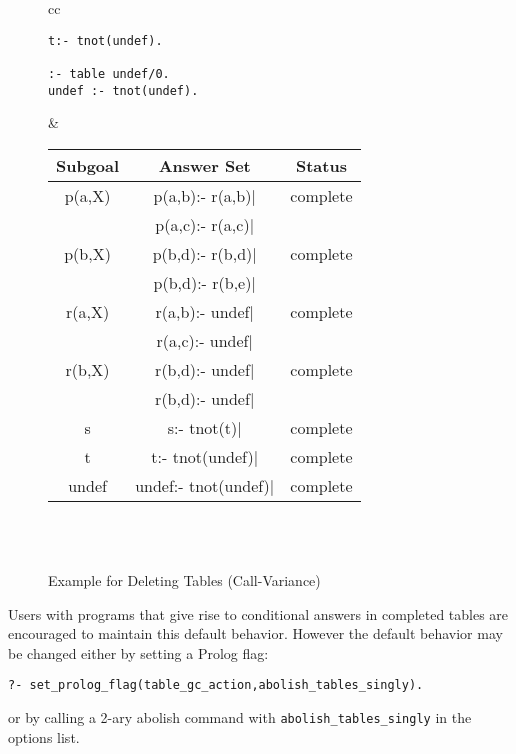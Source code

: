 \begin{description}
\begin{figure}[htb]
\begin{center}
\begin{tabular}{cc}
\begin{minipage}{14.5em}
\begin{verbatim}
t:- tnot(undef).

:- table undef/0.
undef :- tnot(undef).
\end{verbatim}
\end{minipage}
&
\begin{tabular}{|c|c|c|} \hline
  Subgoal & Answer Set & Status\\ \hline \hline
  p(a,X)  & p(a,b):- r(a,b)$|$ & complete \\ 
          & p(a,c):- r(a,c)$|$ & \\ \hline
  p(b,X)  & p(b,d):- r(b,d)$|$ & complete \\ 
          & p(b,d):- r(b,e)$|$ & \\ \hline \hline
  r(a,X)  & r(a,b):- undef$|$  & complete \\ 
          & r(a,c):- undef$|$  & \\ \hline
  r(b,X)  & r(b,d):- undef$|$  & complete \\ 
          & r(b,d):- undef$|$  & \\ \hline \hline
  s       & s:- tnot(t)$|$     & complete \\ \hline \hline
  t       & t:- tnot(undef)$|$ & complete \\ \hline \hline
  undef   & undef:- tnot(undef)$|$ & complete \\ \hline \hline
\end{tabular} \\
\vspace*{-2ex} \\ \hline \hline
\end{tabular}
\end{center}
\caption{Example for Deleting Tables (Call-Variance)} \label{ex:deletion}
\end{figure}

Users with programs that give rise to conditional answers in completed
tables are encouraged to maintain this default behavior.  However the
default behavior may be changed either by setting a Prolog flag:
%
\begin{verbatim}
?- set_prolog_flag(table_gc_action,abolish_tables_singly).
\end{verbatim}
%
or by calling a 2-ary abolish command with {\tt abolish\_tables\_singly}
in the options list.


\end{description}
